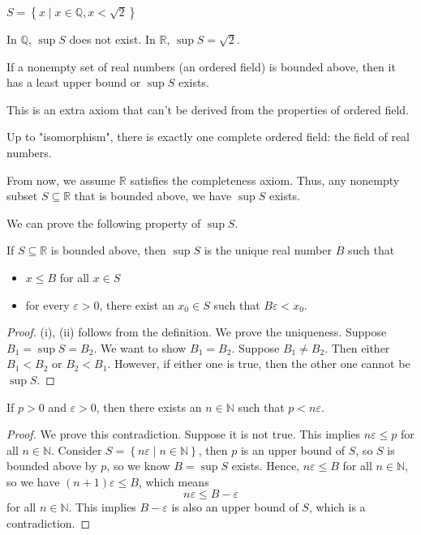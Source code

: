 \begin{eg}
  \(S = \left\{ x \mid x \in \mathbb{Q} , x < \sqrt{2}  \right\} \) 
\end{eg}

In \(\mathbb{Q} \), \(\sup S\) does not exist. In \(\mathbb{R} \), \(\sup S = \sqrt{2} \).    

\begin{theorem}
  If a nonempty set of real numbers (an ordered field) is bounded above, then it has a least upper bound or \(\sup S\) exists. 
\end{theorem}
\begin{remark}
  This is an extra axiom that can't be derived from the properties of ordered field. 
\end{remark}
\begin{remark}
  Up to "isomorphism", there is exactly one complete ordered field: the field of real numbers.
\end{remark}
\begin{remark}
  From now, we assume \(\mathbb{R} \) satisfies the completeness axiom. Thus, any nonempty subset \(S \subseteq \mathbb{R} \) that is bounded above, we have \(\sup S\) exists.   
\end{remark}
We can prove the following property of \(\sup S\).
\begin{theorem}
  If \(S \subseteq \mathbb{R} \) is bounded above, then \(\sup S\) is the unique real number \(B\) such that 
  \begin{itemize}
    \item [(i)] \(x \le B\) for all \(x \in S\)
    \item [(ii)] for every \(\varepsilon > 0\), there exist an \(x_0 \in S\) such that \(B \varepsilon < x_0\).     
  \end{itemize}   
\end{theorem} 
\begin{proof}
  (i), (ii) follows from the definition. We prove the uniqueness. Suppose \(B_1 = \sup S = B_2\). We want to show \(B_1 = B_2\). Suppose \(B_1 \neq B_2\). Then either \(B_1 < B_2\) or \(B_2 < B_1\). However, if either one is true, then the other one cannot be \(\sup S\).      
\end{proof}
\begin{theorem}\label{thm: Archimedean property}
  If \(p > 0\) and \(\varepsilon > 0\), then there exists an \(n \in \mathbb{N} \) such that \(p < n \varepsilon \).    
\end{theorem}
\begin{proof}
  We prove this contradiction. Suppose it is not true. This implies \(n \varepsilon \le p\) for all \(n \in \mathbb{N} \). Consider \(S = \left\{ n \varepsilon \mid n \in \mathbb{N}  \right\} \), then \(p\) is an upper bound of \(S\), so \(S\) is bounded above by \(p\), so we know \(B = \sup S\) exists. Hence, \(n \varepsilon \le B\) for all \(n \in \mathbb{N} \), so we have \((n+1)\varepsilon \le B\), which means
  \[
    n \varepsilon \le B - \varepsilon 
  \]   for all \(n \in \mathbb{N} \). This implies \(B - \varepsilon \) is also an upper bound of \(S\), which is a contradiction.   
\end{proof}
